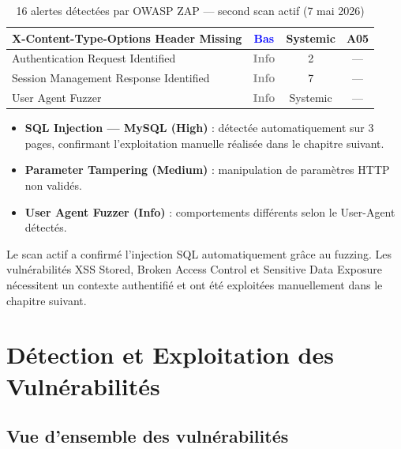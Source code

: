 ﻿\documentclass[12pt,a4paper]{report}
\begin{document}
\begin{table}[H]
\begin{tabular}{p{8.5cm}ccc}
    X-Content-Type-Options Header Missing & \textcolor{blue}{\textbf{Bas}} & Systemic & A05 \\
    \midrule
    Authentication Request Identified & \textcolor{gray}{\textbf{Info}} & 2 & --- \\
    Session Management Response Identified & \textcolor{gray}{\textbf{Info}} & 7 & --- \\
    User Agent Fuzzer & \textcolor{gray}{\textbf{Info}} & Systemic & --- \\
    \bottomrule
  \end{tabular}
  \caption{16 alertes détectées par OWASP ZAP --- second scan actif (7 mai 2026)}
\end{table}


\begin{warningbox}
\begin{itemize}
  \item \textbf{SQL Injection --- MySQL (High)} : détectée automatiquement sur 3 pages, confirmant
    l'exploitation manuelle réalisée dans le chapitre suivant.
  \item \textbf{Parameter Tampering (Medium)} : manipulation de paramètres HTTP non validés.
  \item \textbf{User Agent Fuzzer (Info)} : comportements différents selon le User-Agent détectés.
\end{itemize}
\end{warningbox}

\begin{infobox}
Le scan actif a confirmé l'injection SQL automatiquement grâce au fuzzing. Les vulnérabilités
XSS Stored, Broken Access Control et Sensitive Data Exposure nécessitent un contexte
authentifié et ont été exploitées manuellement dans le chapitre suivant.
\end{infobox}

\newpage

\chapter{Détection et Exploitation des Vulnérabilités}

\section{Vue d'ensemble des vulnérabilités}
\end{document}
